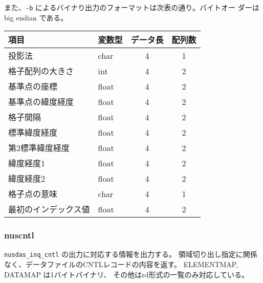\begin{itemize}
また、{\tt -b} によるバイナり出力のフォーマットは次表の通り。バイトオー
ダーは big endian である。

\begin{tabular}{l|l|c|c}\hline
項目              & 変数型 & データ長  & 配列数\\\hline
投影法            & char &  4 & 1 \\ 
格子配列の大きさ  & int  &  4 & 2 \\
基準点の座標      & float & 4 & 2 \\
基準点の緯度経度  & float & 4 & 2 \\
格子間隔          & float & 4 & 2 \\
標準緯度経度      & float & 4 & 2 \\
第2標準緯度経度   & float & 4 & 2 \\
緯度経度1         & float & 4 & 2 \\
緯度経度2         & float & 4 & 2 \\
格子点の意味      & char  & 4 & 1\\
最初のインデックス値  & float &    4 & 2 \\\hline

\end{tabular}
\end{itemize}

\subsubsection{nuscntl}
{\tt nusdas\_inq\_cntl} の出力に対応する情報を出力する。
領域切り出し指定に関係なく、データファイルのCNTLレコードの内容を返す。
ELEMENTMAP, DATAMAP は1バイトバイナリ、
その他はrd形式の一覧のみ対応している。

